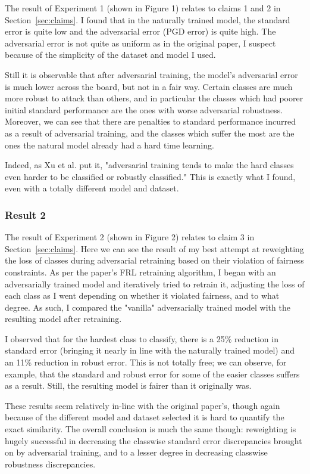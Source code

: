 The result of Experiment 1 (shown in Figure 1) relates to claims 1 and 2 in Section~\ref{sec:claims}. I found that in the naturally trained model, the standard error is quite low and the adversarial error (PGD error) is quite high. The adversarial error is not quite as uniform as in the original paper, I suspect because of the simplicity of the dataset and model I used. 

Still it is observable that after adversarial training, the model's adversarial error is much lower across the board, but not in a fair way. Certain classes are much more robust to attack than others, and in particular the classes which had poorer initial standard performance are the ones with worse adversarial robustness. Moreover, we can see that there are penalties to standard performance incurred as a result of adversarial training, and the classes which suffer the most are the ones the natural model already had a hard time learning. 

Indeed, as Xu et al. put it, "adversarial training tends to make the hard classes even harder to be classified or robustly classified." This is exactly what I found, even with a totally different model and dataset.


\subsubsection{Result 2}

The result of Experiment 2 (shown in Figure 2) relates to claim 3 in Section~\ref{sec:claims}. Here we can see the result of my best attempt at reweighting the loss of classes during adversarial retraining based on their violation of fairness constraints. As per the paper's FRL retraining algorithm, I began with an adversarially trained model and iteratively tried to retrain it, adjusting the loss of each class as I went depending on whether it violated fairness, and to what degree. As such, I compared the "vanilla" adversarially trained model with the resulting model after retraining. 

I observed that for the hardest class to classify, there is a 25\% reduction in standard error (bringing it nearly in line with the naturally trained model) and an 11\% reduction in robust error. This is not totally free; we can observe, for example, that the standard and robust error for some of the easier classes suffers as a result. Still, the resulting model is fairer than it originally was. 

These results seem relatively in-line with the original paper's, though again because of the different model and dataset selected it is hard to quantify the exact similarity. The overall conclusion is much the same though: reweighting is hugely successful in decreasing the classwise standard error discrepancies brought on by adversarial training, and to a lesser degree in decreasing classwise robustness discrepancies. 

